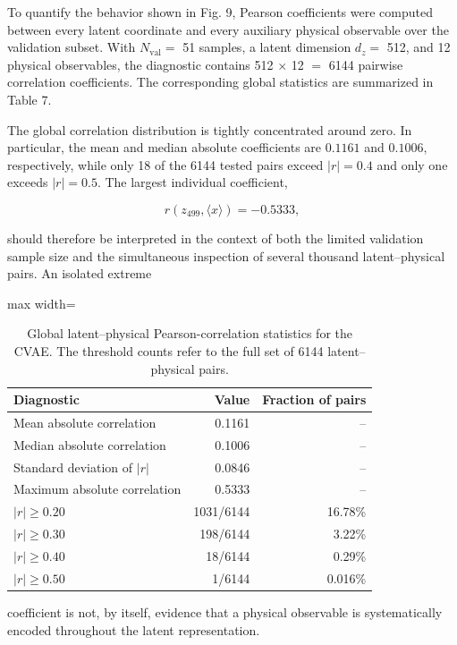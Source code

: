 To quantify the behavior shown in Fig. 9, Pearson coefficients were computed between every latent coordinate and every auxiliary physical observable over the validation subset. With \(N_{\mathrm{val}} =\) 51 samples, a latent dimension \(d_{z} =\) 512, and 12 physical observables, the diagnostic contains 512 \(\times\) 12 \ensuremath{=} 6144 pairwise correlation coefficients. The corresponding global statistics are summarized in Table 7.

The global correlation distribution is tightly concentrated around zero. In particular, the mean and median absolute coefficients are \(0.1161\) and \(0.1006 ,\) respectively, while only 18 of the 6144 tested pairs exceed \(| r | = 0.4\) and only one exceeds \(| r | = 0.5 .\) The largest individual coefficient,

\[
r(z_{499},\langle x\rangle)=-0.5333,
\]

should therefore be interpreted in the context of both the limited validation sample size and the simultaneous inspection of several thousand latent–physical pairs. An isolated extreme

\begin{table}[!htbp]
\centering\small
\caption{Global latent–physical Pearson-correlation statistics for the CVAE. The threshold counts refer to the full set of 6144 latent–physical pairs.}
\label{tab:7}
\begin{adjustbox}{max width=\linewidth}
\begin{tabular}{lrr}\toprule
Diagnostic & Value & Fraction of pairs\\\midrule
Mean absolute correlation & 0.1161 & --\\
Median absolute correlation & 0.1006 & --\\
Standard deviation of $|r|$ & 0.0846 & --\\
Maximum absolute correlation & 0.5333 & --\\
$|r|\ge0.20$ & 1031/6144 & 16.78\%\\
$|r|\ge0.30$ & 198/6144 & 3.22\%\\
$|r|\ge0.40$ & 18/6144 & 0.29\%\\
$|r|\ge0.50$ & 1/6144 & 0.016\%\\\bottomrule\end{tabular}
\end{adjustbox}
\end{table}

coefficient is not, by itself, evidence that a physical observable is systematically encoded throughout the latent representation.

